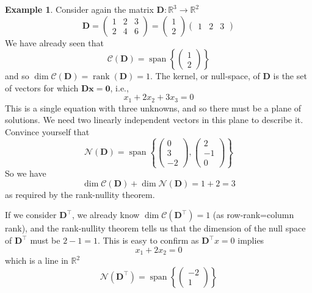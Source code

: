\documentclass[
]{book}
\theoremstyle{definition}
\theoremstyle{definition}
\newtheorem{example}{Example}[chapter]
\theoremstyle{definition}
\theoremstyle{definition}
\theoremstyle{remark}
\begin{document}
\begin{example}
\protect\hypertarget{exm:ranknullityeg}{}\label{exm:ranknullityeg}Consider again the matrix \(\mathbf D: \mathbb{R}^3\rightarrow \mathbb{R}^2\)
\[ \mathbf D=\left( \begin{array}{ccc} 1 & 2&3\\ 2&4&6 \end{array}\right)= \left( \begin{array}{c} 1 \\ 2 \end{array}\right)\left(\begin{array}{ccc}1&2&3\end{array}\right)
\]
We have already seen that
\[\mathcal{C}(\mathbf D)=\operatorname{span}\left\{\left(\begin{array}{c}1\\2\end{array}\right)\right\}\]
and so \(\dim \mathcal{C}(\mathbf D)=\operatorname{rank}(\mathbf D)=1\).
The kernel, or null-space, of \(\mathbf D\) is the set of vectors for which \(\mathbf D\mathbf x={\boldsymbol 0}\), i.e.,
\[x_1+2x_2+3x_3=0\]
This is a single equation with three unknowns, and so there must be a plane of solutions. We need two linearly independent vectors in this plane to describe it. Convince yourself that
\[\mathcal{N}(\mathbf D) = \operatorname{span}\left\{\left(\begin{array}{c}0\\3\\-2\end{array}\right), \left(\begin{array}{c}2\\-1\\0\end{array}\right)\right\}\]
So we have
\[\dim \mathcal{C}(\mathbf D)+\dim \mathcal{N}(\mathbf D)=1+2=3\]
as required by the rank-nullity theorem.

If we consider \(\mathbf D^\top\), we already know \(\dim \mathcal{C}(\mathbf D^\top)=1\) (as row-rank=column rank), and the rank-nullity theorem tells us that the dimension of the null space of \(\mathbf D^\top\) must be \(2-1=1\). This is easy to confirm as \(\mathbf D^\top x=0\) implies
\[x_1+2x_2=0\]
which is a line in \(\mathbb{R}^2\)
\[\mathcal{N}(\mathbf D^\top) = \operatorname{span}\left\{ \left(\begin{array}{c}-2\\1\end{array}\right)\right\}\]
\end{example}
\end{document}
